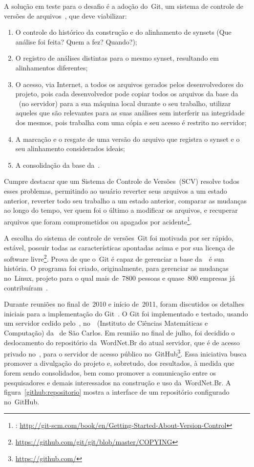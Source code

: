 A solução em teste para o desafio é a adoção do~Git, um sistema de controle de
versões de arquivos~\cite{chacon}, que deve viabilizar:

\begin{enumerate}
  \item O controle do histórico da construção e do alinhamento de synsets (Que
    análise foi feita? Quem a fez? Quando?);
  \item O registro de análises distintas para o mesmo synset, resultando em
    alinhamentos diferentes;
  \item O acesso, via Internet, a todos os arquivos gerados pelos
    desenvolvedores do projeto, pois cada desenvolvedor pode copiar todos os
    arquivos da base da \wnbr\ (no servidor) para a sua máquina local durante o
    seu trabalho, utilizar aqueles que são relevantes para as suas análises sem
    interferir na integridade dos mesmos, pois trabalha com uma cópia e seu
    acesso é restrito no servidor;
  \item A marcação e o resgate de uma versão do arquivo que registra o synset e
    o seu alinhamento considerados ideais;
  \item A consolidação da base da~\wnbr.
\end{enumerate}

Cumpre destacar que um Sistema de Controle de Versões~(SCV) resolve todos esses
problemas, permitindo ao usuário reverter seus arquivos a um estado anterior,
reverter todo seu trabalho a um estado anterior, comparar as mudanças ao longo
do tempo, ver quem foi o último a modificar os arquivos, e recuperar arquivos
que foram comprometidos ou apagados por acidente\footnote{:
\url{http://git-scm.com/book/en/Getting-Started-About-Version-Control}}.

A escolha do sistema de controle de versões~Git foi motivada por ser rápido,
estável, possuir todas as características apontadas acima e por sua licença de
software livre\footnote{\url{https://github.com/git/git/blob/master/COPYING}}.
Prova de que o~Git é capaz de gerenciar a base da~\wnbr\ é sua história. O
programa foi criado, originalmente, para gerenciar as mudanças no~Linux,
projeto para o qual mais de~7800 pessoas e quase~800 empresas já
contribuíram~\cite[p.~1]{corbetetal}.

Durante reuniões no final de~2010 e início de~2011, foram discutidos os
detalhes iniciais para a implementação do Git~\cite[p.~4]{beraldo11}. O Git foi
implementado e testado, usando um servidor cedido pelo~\nilc, no~\icmc\
(Instituto de Ciências Matemáticas e Computação) da \usp\ de São Carlos. Em
reunião no final de julho, foi decidido o deslocamento do repositório
da~WordNet.Br do atual servidor, que é de acesso privado no~\nilc, para o
servidor de acesso público no~GitHub\footnote{\url{https://github.com/}}. Essa
iniciativa busca promover a divulgação do projeto e, sobretudo, dos resultados,
à medida que forem sendo consolidados, bem como promover a comunicação entre os
pesquisadores e demais interessados na construção e uso da~WordNet.Br. A
figura~\ref{github:repositorio} mostra a interface de um repositório
configurado no~GitHub.

